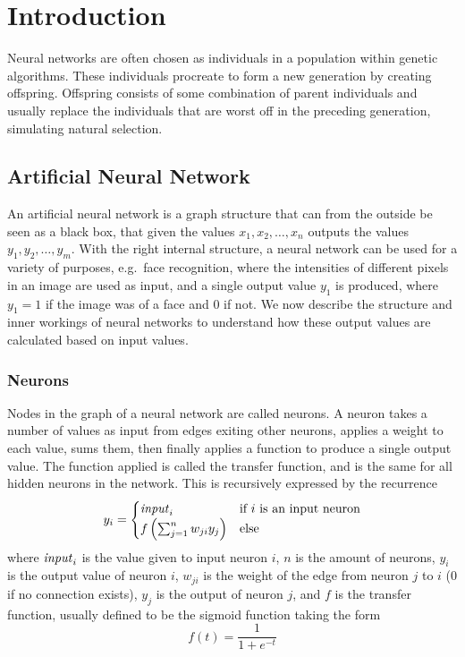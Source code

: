 \section{Introduction}
Neural networks are often chosen as individuals in a population within genetic algorithms. These individuals procreate to form a new generation by creating offspring. Offspring consists of some combination of parent individuals and usually replace the individuals that are worst off in the preceding generation, simulating natural selection.

\subsection{Artificial Neural Network}
An artificial neural network is a graph structure that can from the outside be seen as a black box, that given the values $x_1, x_2, \dots, x_n$ outputs the values $y_1, y_2, \dots, y_m$. With the right internal structure, a neural network can be used for a variety of purposes, e.g.\ face recognition, where the intensities of different pixels in an image are used as input, and a single output value $y_1$ is produced, where $y_1 = 1$ if the image was of a face and $0$ if not. We now describe the structure and inner workings of neural networks to understand how these output values are calculated based on input values.

\subsubsection{Neurons}
Nodes in the graph of a neural network are called neurons. A neuron takes a number of values as input from edges exiting other neurons, applies a weight to each value, sums them, then finally applies a function to produce a single output value. The function applied is called the transfer function, and is the same for all hidden neurons in the network. This is recursively expressed by the recurrence
\begin{equation}
  y_i =
  \begin{cases}
    \var{input}_i & \text{if } i \text{ is an input neuron} \\
    f\left(\sum_{j=1}^n w_{ji} y_{j} \right) & \text{else} %
  \end{cases}
\end{equation}
where $\mathit{input}_i$ is the value given to input neuron $i$, $n$ is the amount of neurons, $y_i$ is the output value of neuron $i$, $w_{ji}$ is the weight of the edge from neuron $j$ to $i$ ($0$ if no connection exists), $y_j$ is the output of neuron $j$, and $f$ is the transfer function, usually defined to be the sigmoid function taking the form
\begin{equation*}
  f(t) = \frac{1}{1+e^{-t}}
\end{equation*}

